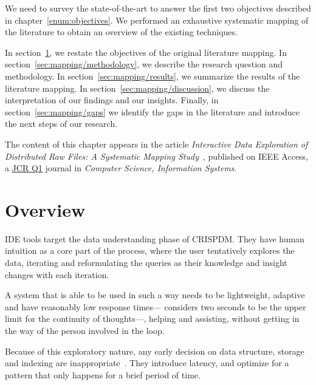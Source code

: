 
We need to survey the state-of-the-art to answer the first two objectives described in
chapter~\ref{enum:objectives}.
We performed an exhaustive systematic mapping of the literature to obtain an overview
of the existing techniques.

In section~\ref{sec:mapping/overview}, we restate the objectives of the original
literature mapping.
In section~\ref{sec:mapping/methodology}, we describe the research question and methodology.
In section~\ref{sec:mapping/results}, we summarize the results of the literature mapping.
In section~\ref{sec:mapping/discussion}, we discuss the interpretation of our findings and our insights.
Finally, in section~\ref{sec:mapping/gaps} we identify the gaps in the literature and introduce
the next steps of our research.

The content of this chapter appears in the article
\emph{Interactive Data Exploration of Distributed Raw Files: A Systematic Mapping
Study}~\cite{Alvarez2019}, published on IEEE Access, a
\href{https://jcr.clarivate.com/jcr-jp/journal-profile?journal=IEEE\%20ACCESS&year=2019}{\gls{JCR} \gls{Q1}}
journal in \emph{Computer Science, Information Systems}.

\section{Overview}
\label{sec:mapping/overview}
\gls{IDE} tools target the data understanding phase of \gls{CRISPDM}. They have
human intuition as a core part of the process, where the user tentatively
explores the data, iterating and reformulating the queries as
their knowledge and insight changes with each iteration.

A system that is able to be used in such a way needs to be lightweight, adaptive
and have reasonably low response times---\cite{Miller1968} considers two seconds
to be the upper limit for the continuity of thoughts---,
helping and assisting, without getting in the way of the person involved in
the loop.

Because of this exploratory nature, any early decision on data structure,
storage and indexing are inappropriate~\cite{Kersten2011}. They introduce latency,
and optimize for a pattern that only happens for a brief period of time.

